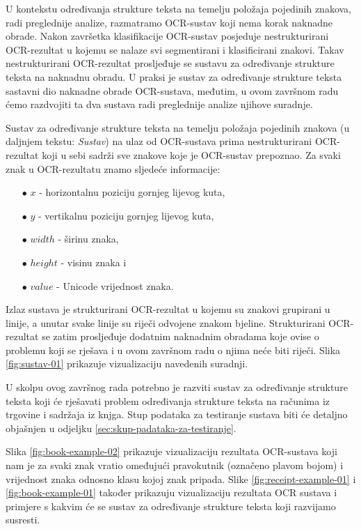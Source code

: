 \documentclass[times, utf8, zavrsni]{fer}
\begin{document}
U kontekstu određivanja strukture teksta na temelju položaja pojedinih znakova,
radi preglednije analize, razmatramo OCR-sustav koji nema
korak naknadne obrade. Nakon završetka klasifikacije OCR-sustav posjeduje
nestrukturirani OCR-rezultat u kojemu se nalaze svi segmentirani i
klasificirani znakovi. Takav
nestrukturirani OCR-rezultat prosljeđuje se sustavu za određivanje strukture
teksta na naknadnu obradu.
U praksi je sustav za određivanje strukture teksta sastavni dio naknadne obrade OCR-sustava, međutim, u ovom završnom radu ćemo razdvojiti ta dva sustava
radi preglednije analize njihove suradnje.

Sustav za određivanje strukture teksta na temelju položaja pojedinih znakova
(u daljnjem tekstu: \emph{Sustav}) na ulaz od OCR-sustava prima
nestrukturirani OCR-rezultat koji u sebi sadrži sve znakove koje je OCR-sustav
prepoznao. Za svaki znak u OCR-rezultatu znamo sljedeće informacije:
\begin{itemize}
    \item[$\bullet$] $x$ - horizontalnu poziciju gornjeg lijevog kuta,
    \item[$\bullet$] $y$ - vertikalnu poziciju gornjeg lijevog kuta,
    \item[$\bullet$] $width$ - širinu znaka,
    \item[$\bullet$] $height$ - visinu znaka i
    \item[$\bullet$] $value$ - Unicode vrijednost znaka.
\end{itemize}

Izlaz sustava je strukturirani OCR-rezultat u kojemu su znakovi
grupirani u linije, a unutar svake linije su riječi odvojene znakom
bjeline. Strukturirani OCR-rezultat se zatim prosljeđuje dodatnim naknadnim
obradama koje ovise o problemu koji se rješava i u ovom završnom radu o njima
neće biti riječi. Slika \ref{fig:sustav-01} prikazuje vizualizaciju navedenih
suradnji.

U skolpu ovog završnog rada potrebno je razviti sustav za određivanje strukture
teksta koji će rješavati problem određivanja strukture teksta na računima iz
trgovine i sadržaja iz knjga. Stup podataka za testiranje
sustava biti će detaljno objašnjen u odjeljku
\ref{sec:skup-padataka-za-testiranje}.

Slika \ref{fig:book-example-02} prikazuje vizualizaciju rezultata OCR-sustava
koji nam je za svaki znak vratio omeđujući pravokutnik (označeno plavom bojom) i
vrijednost znaka odnosno klasu kojoj znak pripada.
Slike \ref{fig:receipt-example-01} i \ref{fig:book-example-01} također prikazuju
vizualizaciju rezultata OCR sustava i primjere s kakvim će se sustav za
određivanje strukture teksta koji razvijamo susresti.
\end{document}
